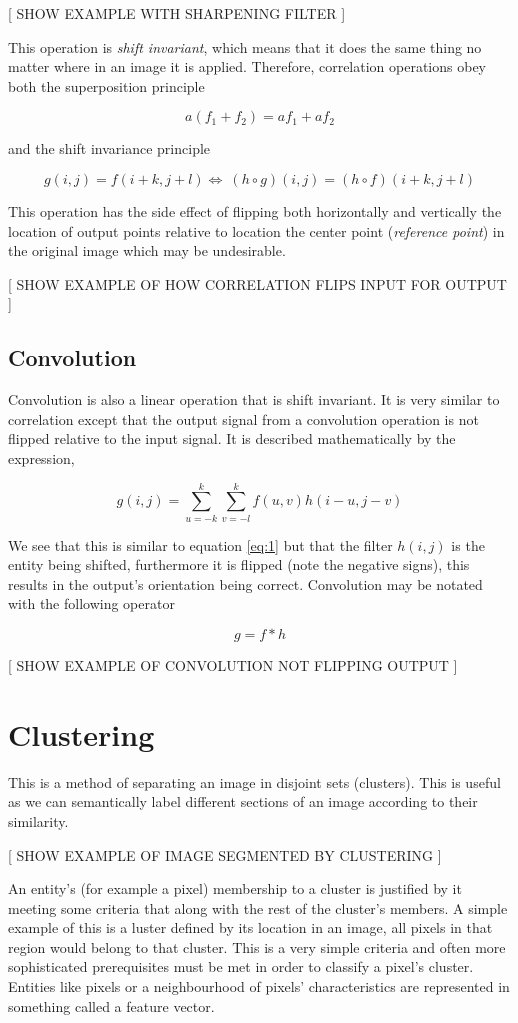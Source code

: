 [ SHOW EXAMPLE WITH SHARPENING FILTER ]

This operation is \emph{shift invariant}, which means that it does the same thing no matter where in an image it is applied. Therefore, correlation operations obey both the superposition principle

\[a(f_1 + f_2) = af_1 + af_2\]

and the shift invariance principle

\[g(i,j)=f(i+k,j+l) \Leftrightarrow\ (h\circ g)(i,j)=(h\circ f)(i+k,j+l)\]

This operation has the side effect of flipping both horizontally and vertically the location of output points relative to location the center point (\emph{reference point}) in the original image which may be undesirable.

[ SHOW EXAMPLE OF HOW CORRELATION FLIPS INPUT FOR OUTPUT ]

\subsection{Convolution}

Convolution is also a linear operation that is shift invariant. It is very similar to correlation except that the output signal from a convolution operation is not flipped relative to the input signal. It is described mathematically by the expression,

\[ g(i,j) = \sum_{u=-k}^{k}\sum_{v = -l}^{k}f(u,v)h(i-u,j-v)\]

We see that this is similar to equation \ref{eq:1} but that the filter $h(i,j)$ is the entity being shifted, furthermore it is flipped (note the negative signs), this results in the output's orientation being correct. Convolution may be notated with the following operator

\[g = f \ast h\]

[ SHOW EXAMPLE OF CONVOLUTION NOT FLIPPING OUTPUT ]


\section{Clustering}
This is a method of separating an image in disjoint sets (clusters). This is useful as we can semantically label different sections of an image according to their similarity.

[ SHOW EXAMPLE OF IMAGE SEGMENTED BY CLUSTERING ]

An entity’s  (for example a pixel) membership to a cluster is justified by it meeting some criteria that along with the rest of the cluster’s members. A simple example of this is a luster defined by its location in an image, all pixels in that region would belong to that cluster. This is a very simple criteria and often more sophisticated prerequisites must be met in order to classify a pixel's cluster. Entities like pixels or a neighbourhood of pixels' characteristics are represented in something called a feature vector.


